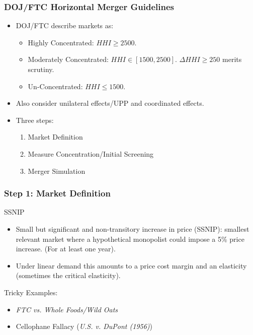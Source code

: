 \documentclass[aspectratio=169,10pt]{beamer}
\begin{document}
\begin{frame}
\frametitle{DOJ/FTC Horizontal Merger Guidelines}
 \begin{itemize}
\item DOJ/FTC describe markets as:
\begin{itemize}
\item Highly Concentrated: $HHI \geq 2500$.
\item Moderately Concentrated: $HHI \in [1500,2500]$. $\Delta HHI \geq 250$ merits scrutiny.
\item Un-Concentrated: $HHI \leq 1500$.
\end{itemize}
\item Also consider \alert{unilateral effects}/UPP and \alert{coordinated effects}.
\item Three steps:
\begin{enumerate}
\item Market Definition
\item Measure Concentration/Initial Screening
\item Merger Simulation
\end{enumerate}
 \end{itemize}
\end{frame}

\begin{frame}
\frametitle{Step 1: Market Definition}
SSNIP
 \begin{itemize}
\item Small but significant and non-transitory increase in price (SSNIP): smallest relevant market where a hypothetical monopolist could impose a 5\% price increase. (For at least one year).
\item Under linear demand this amounts to a price cost margin and an elasticity (sometimes the \alert{critical elasticity}).
 \end{itemize}
 Tricky Examples:
  \begin{itemize}
\item \textit{FTC vs. Whole Foods/Wild Oats}
\item Cellophane Fallacy (\textit{U.S. v. DuPont (1956)})
 \end{itemize}
\end{frame}
\end{document}
